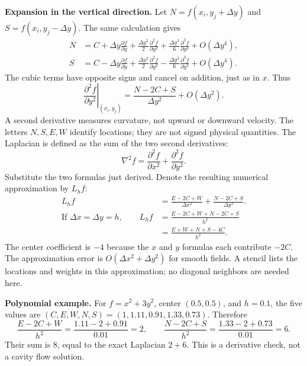 \textbf{Expansion in the vertical direction.} Let $N=f(x_i,y_j+\Delta y)$ and $S=f(x_i,y_j-\Delta y)$. The same calculation gives
\begin{align*}
N&=C+\Delta y\frac{\partial f}{\partial y}+\frac{\Delta y^2}{2}\frac{\partial^2f}{\partial y^2}+\frac{\Delta y^3}{6}\frac{\partial^3f}{\partial y^3}+O(\Delta y^4),\\
S&=C-\Delta y\frac{\partial f}{\partial y}+\frac{\Delta y^2}{2}\frac{\partial^2f}{\partial y^2}-\frac{\Delta y^3}{6}\frac{\partial^3f}{\partial y^3}+O(\Delta y^4).
\end{align*}
The cubic terms have opposite signs and cancel on addition, just as in $x$. Thus
\[
\boxed{\left.\frac{\partial^2f}{\partial y^2}\right|_{(x_i,y_j)}
=\frac{N-2C+S}{\Delta y^2}+O(\Delta y^2).}
\]
A second derivative measures curvature, not upward or downward velocity. The letters $N,S,E,W$ identify locations; they are not signed physical quantities.
\newpage
{}
The Laplacian is defined as the sum of the two second derivatives:
\[
\nabla^2 f=\frac{\partial^2f}{\partial x^2}+\frac{\partial^2f}{\partial y^2}.
\]
Substitute the two formulas just derived. Denote the resulting numerical approximation by $L_h f$:
\begin{align*}
L_hf&=\frac{E-2C+W}{\Delta x^2}+\frac{N-2C+S}{\Delta y^2}.\\
\text{If }\Delta x=\Delta y=h,\qquad
L_hf&=\frac{E-2C+W+N-2C+S}{h^2}\\
&=\boxed{\frac{E+W+N+S-4C}{h^2}}.
\end{align*}
The center coefficient is $-4$ because the $x$ and $y$ formulas each contribute $-2C$. The approximation error is $O(\Delta x^2+\Delta y^2)$ for smooth fields. A stencil lists the locations and weights in this approximation; no diagonal neighbors are needed here.
\begin{center}
\end{center}
\textbf{Polynomial example.} For $f=x^2+3y^2$, center $(0.5,0.5)$, and $h=0.1$, the five values are $(C,E,W,N,S)=(1,1.11,0.91,1.33,0.73)$. Therefore
\[
\frac{E-2C+W}{h^2}=\frac{1.11-2+0.91}{0.01}=2,\qquad
\frac{N-2C+S}{h^2}=\frac{1.33-2+0.73}{0.01}=6.
\]
Their sum is $8$, equal to the exact Laplacian $2+6$. This is a derivative check, not a cavity flow solution.

